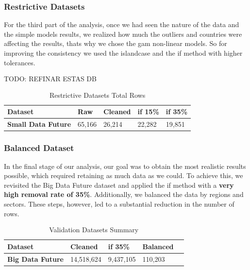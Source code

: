 \documentclass[11pt,english,a4paper,hidelinks]{book}
\begin{document}
\subsubsection{Restrictive Datasets}
\noindent For the third part of the analysis, once we had seen the nature of the data and the simple models results, we realized how much the outliers and countries were affecting the results, thats why we chose the \acrshort{gam} non-linear models. So for improving the consistency we used the \acrshort{islandcase} and the \acrshort{if} method with higher tolerances.



TODO: REFINAR ESTAS DB
\begin{table}[H]
    \centering
    \caption{Restrictive Datasets Total Rows}
    \begin{tabular}{|l|l|l|l|l|}
        \hline  
        \textbf{Dataset} & \textbf{Raw} & \textbf{Cleaned} & \textbf{ \acrshort{if} 15\%} & \textbf{ \acrshort{if} 35\%} \\
        \hline
        \textbf{Small Data Future} & 65,166 & 26,214 & 22,282 & 19,851 \\
        \hline
        \end{tabular}
    \label{tab:restrictive_datasets_rows}
\end{table}

\subsubsection{Balanced Dataset}

\noindent In the final stage of our analysis, our goal was to obtain the most realistic results possible, which required retaining as much data as we could. To achieve this, we revisited the Big Data Future dataset and applied the \acrshort{if} method with a \textbf{very high removal rate of 35\%}. Additionally, we balanced the data by regions and sectors. These steps, however, led to a substantial reduction in the number of rows.

\begin{table}[H]
    \centering
    \caption{Validation Datasets Summary}
    \begin{tabular}{|l|l|l|l|l|}
        \hline  
        \textbf{Dataset} & \textbf{Cleaned} & \textbf{ \acrshort{if} 35\%} & \textbf{{Balanced}} \\
        \hline
        \textbf{Big Data Future} & 14,518,624 & 9,437,105 & 110,203 \\
        \hline
        \end{tabular}
    \label{tab:validation_datasets_summary}
\end{table}
\end{document}
